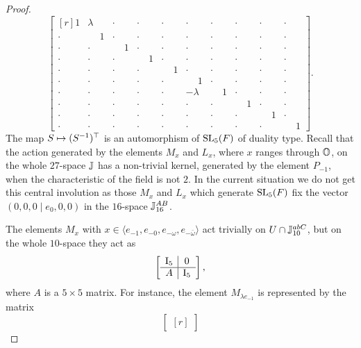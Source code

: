 \begin{proof}
\begin{equation*}
\begin{bmatrix}[r]
		1 & \lambda & \cdot & \cdot & \cdot & \cdot & \cdot & \cdot & \cdot & \cdot  \\
		 \cdot & \phantom{-}1 & \cdot & \cdot & \cdot & \cdot & \cdot & \cdot & \cdot & \cdot  \\
		 \cdot & \cdot & \phantom{-}1 &  \cdot & \cdot & \cdot & \cdot & \cdot & \cdot & \cdot \\
		  \cdot & \cdot & \cdot & \phantom{-}1 & \cdot & \cdot & \cdot & \cdot & \cdot & \cdot \\
		  \cdot & \cdot & \cdot & \cdot & \phantom{-}1 & \cdot & \cdot & \cdot & \cdot & \cdot \\
		  \cdot & \cdot & \cdot & \cdot & \cdot & \phantom{-}1 &  \cdot & \cdot & \cdot & \cdot \\
		  \cdot & \cdot & \cdot & \cdot & \cdot & -\lambda & \phantom{-}1 &  \cdot & \cdot & \cdot  \\
		  \cdot & \cdot & \cdot & \cdot & \cdot & \cdot & \cdot & \phantom{-}1 &  \cdot & \cdot \\
		  \cdot & \cdot & \cdot & \cdot & \cdot & \cdot & \cdot & \cdot & \phantom{-}1 & \cdot \\
		  \cdot & \cdot & \cdot & \cdot & \cdot & \cdot & \cdot & \cdot & \cdot & \phantom{-}1  
	
	\end{bmatrix}.
	\end{equation*}
The map $S \mapsto (S^{-1})^{\top}$ is an automorphism of 
$\mathrm{SL}_5(F)$ of duality type. Recall that the action 
generated by the
 elements $M_x$ and $L_x$, where $x$ ranges through $\mathbb{O}$, 
 on the whole $27$-space $\mathbb{J}$ has a non-trivial kernel,
 generated by the element $P_{-1}$, when the characteristic of 
 the field is not $2$. In the current situation we do not
 get this central involution as those $M_x$ and $L_x$ which 
 generate $\mathrm{SL}_5(F)$ fix the vector $(0,0,0 \mid e_0,0,0)$
 in the $16$-space $\mathbb{J}_{16}^{AB}$.


The elements $M_x$ with $x \in \langle e_{-1}, e_{-0}, e_{-\omega}, e_{-\bar{\omega}} \rangle$ act trivially on $U\cap \mathbb{J}_{10}^{abC}$, but
	on the whole $10$-space they act as
	\begin{equation*}
		\left[
			\begin{array}{c|c}
				\mathord{\mathrm{I}}_5 & 0 \\ \hline
				A & \mathord{\mathrm{I}}_5
			\end{array}
		\right],
	\end{equation*}
	where $A$ is a $5 \times 5$ matrix. For instance, the element $M_{\lambda e_{-1}}$ is represented by the matrix
	\begin{equation*}
	\begin{bmatrix}[r]
	

\end{bmatrix}
\end{equation*}
\end{proof}
